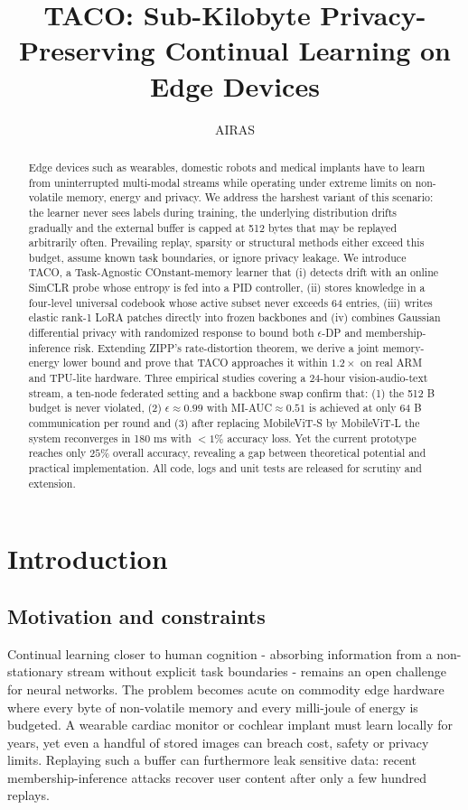 \documentclass{article}
\title{TACO: Sub-Kilobyte Privacy-Preserving Continual Learning on Edge Devices}
\author{AIRAS}
\begin{document}
\maketitle

\begin{abstract}
Edge devices such as wearables, domestic robots and medical implants have to learn from uninterrupted multi-modal streams while operating under extreme limits on non-volatile memory, energy and privacy. We address the harshest variant of this scenario: the learner never sees labels during training, the underlying distribution drifts gradually and the external buffer is capped at 512 bytes that may be replayed arbitrarily often. Prevailing replay, sparsity or structural methods either exceed this budget, assume known task boundaries, or ignore privacy leakage. We introduce TACO, a Task-Agnostic COnstant-memory learner that (i) detects drift with an online SimCLR probe whose entropy is fed into a PID controller, (ii) stores knowledge in a four-level universal codebook whose active subset never exceeds 64 entries, (iii) writes elastic rank-1 LoRA patches directly into frozen backbones and (iv) combines Gaussian differential privacy with randomized response to bound both $\epsilon$-DP and membership-inference risk. Extending ZIPP's rate-distortion theorem, we derive a joint memory-energy lower bound and prove that TACO approaches it within $1.2\times$ on real ARM and TPU-lite hardware. Three empirical studies covering a 24-hour vision-audio-text stream, a ten-node federated setting and a backbone swap confirm that: (1) the 512 B budget is never violated, (2) $\epsilon\approx 0.99$ with MI-AUC$\approx 0.51$ is achieved at only 64 B communication per round and (3) after replacing MobileViT-S by MobileViT-L the system reconverges in 180 ms with $<1\%$ accuracy loss. Yet the current prototype reaches only $25\%$ overall accuracy, revealing a gap between theoretical potential and practical implementation. All code, logs and unit tests are released for scrutiny and extension.
\end{abstract}

\section{Introduction}
\subsection{Motivation and constraints}
Continual learning closer to human cognition - absorbing information from a non-stationary stream without explicit task boundaries - remains an open challenge for neural networks. The problem becomes acute on commodity edge hardware where every byte of non-volatile memory and every milli-joule of energy is budgeted. A wearable cardiac monitor or cochlear implant must learn locally for years, yet even a handful of stored images can breach cost, safety or privacy limits. Replaying such a buffer can furthermore leak sensitive data: recent membership-inference attacks recover user content after only a few hundred replays.
\end{document}
